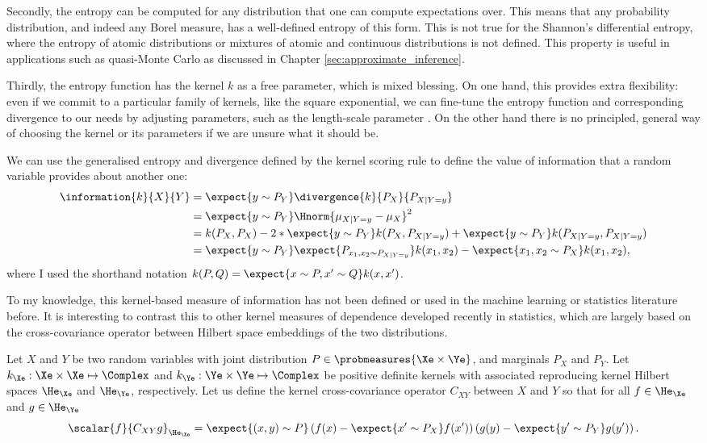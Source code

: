 Secondly, the entropy can be computed for any distribution that one can compute expectations over. This means that any probability distribution, and indeed any Borel measure, has a well-defined entropy of this form. This is not true for the Shannon's differential entropy, where the entropy of atomic distributions or mixtures of atomic and continuous distributions is not defined. This property is useful in applications such as quasi-Monte Carlo as discussed in Chapter \ref{sec:approximate_inference}.

Thirdly, the entropy function has the kernel $k$ as a free parameter, which is mixed blessing. On one hand, this provides extra flexibility: even if we commit to a particular family of kernels, like the square exponential, we can fine-tune the entropy function and corresponding divergence to our needs by adjusting parameters, such as the length-scale parameter \citep{Song2008}. On the other hand there is no principled, general way of choosing the kernel or its parameters if we are unsure what it should be. 

We can use the generalised entropy and divergence defined by the kernel scoring rule to define the value of information that a random variable provides about another one:
%
\begin{align}
	\information{k}{X}{Y} &= \expect{y\sim P_{Y}} \divergence{k}{P_{X}}{P_{X\vert Y=y}}\\
		&=  \expect{y\sim P_{Y}} \Hnorm{ \mu_{X \vert Y=y} - \mu_X }^2 \label{eqn:kernel_information}\\
		&= k(P_{X},P_{X}) - 2*\expect{y\sim P_{Y}}k(P_{X},P_{X\vert Y=y}) + \expect{y\sim P_{Y}} k(P_{X\vert Y=y},P_{X\vert Y=y})\\
		&= \expect{y\sim P_{Y}} \expect{P_{x_1,x_2 \sim P_{X\vert Y=y}}}k(x_1,x_2) - \expect{x_1,x_2\sim P_{X}}k(x_1,x_2),
\end{align}
%
where I used the shorthand notation $k(P,Q)=\expect{x\sim P,x'\sim Q}k(x,x')$.

To my knowledge, this kernel-based measure of information has not been defined or used in the machine learning or statistics literature before. It is interesting to contrast this to other kernel measures of dependence developed recently in statistics, which are largely based on the cross-covariance operator between Hilbert space embeddings of the two distributions.

\begin{definition}
	Let $X$ and $Y$ be two random variables with joint distribution $P\in\probmeasures{\Xe\times\Ye}$, and marginals $P_X$ and $P_Y$. Let $k_{\Xe}:\Xe\times\Xe\mapsto\Complex$ and $k_{\Ye}:\Ye\times\Ye\mapsto\Complex$ be positive definite kernels with associated reproducing kernel Hilbert spaces $\He_\Xe$ and $\He_\Ye$, respectively. Let us define the kernel cross-covariance operator $C_{XY}$ between $X$ and $Y$ so that for all $f\in\He_\Xe$ and $g\in\He_\Ye$
	\begin{equation}
		\scalar{f}{C_{XY}g}_{\He_\Xe} = \expect{(x,y) \sim P} \left( f(x) - \expect{x'\sim P_X} f(x')\right) \left( g(y) - \expect{y' \sim P_Y} g(y')\right).
	\end{equation}
\end{definition}

